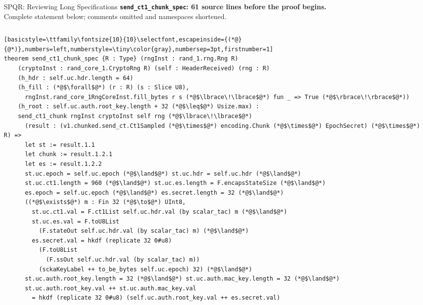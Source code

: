 \documentclass[aspectratio=169,xcolor=dvipsnames]{beamer}
\begin{document}
\begin{frame}[fragile]{SPQR: Reviewing Long Specifications}
    \small
    \textbf{\texttt{send\_ct1\_chunk\_spec}: 61 source lines before the proof begins.}\\
    {\scriptsize Complete statement below; comments omitted and namespaces shortened.}
    \begin{columns}[T,onlytextwidth]
        \begin{column}{0.49\textwidth}
\begin{lrbox}{\longspecbox}
\begin{minipage}{17cm}
\begin{lstlisting}[basicstyle=\ttfamily\fontsize{10}{10}\selectfont,escapeinside={(*@}{@*)},numbers=left,numberstyle=\tiny\color{gray},numbersep=3pt,firstnumber=1]
theorem send_ct1_chunk_spec {R : Type} (rngInst : rand_1.rng.Rng R)
    (cryptoInst : rand_core_1.CryptoRng R) (self : HeaderReceived) (rng : R)
    (h_hdr : self.uc.hdr.length = 64)
    (h_fill : (*@$\forall$@*) (r : R) (s : Slice U8),
      rngInst.rand_core_1RngCoreInst.fill_bytes r s (*@$\lbrace\!\lbrace$@*) fun _ => True (*@$\rbrace\!\rbrace$@*))
    (h_root : self.uc.auth.root_key.length + 32 (*@$\leq$@*) Usize.max) :
    send_ct1_chunk rngInst cryptoInst self rng (*@$\lbrace\!\lbrace$@*)
      (result : (v1.chunked.send_ct.Ct1Sampled (*@$\times$@*) encoding.Chunk (*@$\times$@*) EpochSecret) (*@$\times$@*) R) =>
      let st := result.1.1
      let chunk := result.1.2.1
      let es := result.1.2.2
      st.uc.epoch = self.uc.epoch (*@$\land$@*) st.uc.hdr = self.uc.hdr (*@$\land$@*)
      st.uc.ct1.length = 960 (*@$\land$@*) st.uc.es.length = F.encapsStateSize (*@$\land$@*)
      es.epoch = self.uc.epoch (*@$\land$@*) es.secret.length = 32 (*@$\land$@*)
      ((*@$\exists$@*) m : Fin 32 (*@$\to$@*) UInt8,
        st.uc.ct1.val = F.ct1List self.uc.hdr.val (by scalar_tac) m (*@$\land$@*)
        st.uc.es.val = F.toU8List
          (F.stateOut self.uc.hdr.val (by scalar_tac) m) (*@$\land$@*)
        es.secret.val = hkdf (replicate 32 0#u8)
          (F.toU8List
            (F.ssOut self.uc.hdr.val (by scalar_tac) m))
          (sckaKeyLabel ++ to_be_bytes self.uc.epoch) 32) (*@$\land$@*)
      st.uc.auth.root_key.length = 32 (*@$\land$@*) st.uc.auth.mac_key.length = 32 (*@$\land$@*)
      st.uc.auth.root_key.val ++ st.uc.auth.mac_key.val
        = hkdf (replicate 32 0#u8) (self.uc.auth.root_key.val ++ es.secret.val)

\end{lstlisting}
\end{minipage}
\end{lrbox}
\end{column}
\end{columns}
\end{frame}
\end{document}
